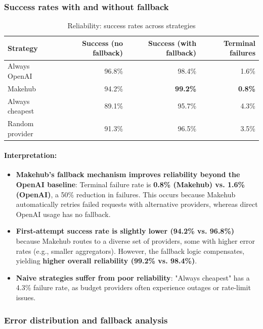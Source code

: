 \documentclass[english]{article}
\begin{document}
\subsubsection{Success rates with and without fallback}

\begin{table}[H]
\centering
\caption{Reliability: success rates across strategies}
\begin{tabular}{|l|r|r|r|}
\hline
\textbf{Strategy} & \textbf{Success (no fallback)} & \textbf{Success (with fallback)} & \textbf{Terminal failures} \\
\hline
Always OpenAI & 96.8\% & 98.4\% & 1.6\% \\
\hline
Makehub & 94.2\% & \textbf{99.2\%} & \textbf{0.8\%} \\
\hline
Always cheapest & 89.1\% & 95.7\% & 4.3\% \\
\hline
Random provider & 91.3\% & 96.5\% & 3.5\% \\
\hline
\end{tabular}
\end{table}

\paragraph{Interpretation:}

\begin{itemize}
\item \textbf{Makehub's fallback mechanism improves reliability beyond the OpenAI baseline}: Terminal failure rate is \textbf{0.8\% (Makehub) vs. 1.6\% (OpenAI)}, a 50\% reduction in failures. This occurs because Makehub automatically retries failed requests with alternative providers, whereas direct OpenAI usage has no fallback.

\item \textbf{First-attempt success rate is slightly lower (94.2\% vs. 96.8\%)} because Makehub routes to a diverse set of providers, some with higher error rates (e.g., smaller aggregators). However, the fallback logic compensates, yielding \textbf{higher overall reliability (99.2\% vs. 98.4\%)}.

\item \textbf{Naive strategies suffer from poor reliability}: "Always cheapest" has a 4.3\% failure rate, as budget providers often experience outages or rate-limit issues.
\end{itemize}

\subsubsection{Error distribution and fallback analysis}
\end{document}
